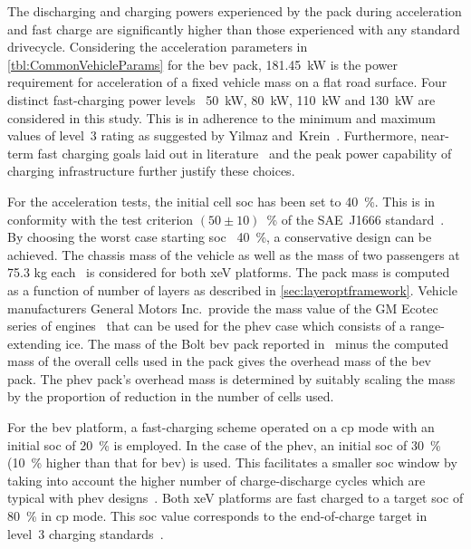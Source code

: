 The   discharging  and   charging  powers   experienced  by   the  pack   during
acceleration and  fast charge  are significantly  higher than  those experienced
with  any  standard  drivecycle.  Considering  the  acceleration  parameters  in
\cref{tbl:CommonVehicleParams} for  the \gls{bev}  pack, \SI{181.45}{\kilo\watt}
is   the  power   requirement  for   acceleration  of   a  fixed   vehicle  mass
on   a   flat  road   surface.   Four   distinct  fast-charging   power   levels
\viz~\SI{50}{\kilo\watt},   \SI{80}{\kilo\watt},  \SI{110}{\kilo\watt}   and
\SI{130}{\kilo\watt}  are considered  in this  study.  This is  in adherence  to
the  minimum  and maximum  values  of  level~3  rating  as suggested  by  Yilmaz
and~Krein~\cite{Yilmaz2012}. Furthermore, near-term fast charging goals laid out
in  literature~\cite{Ashique2017,Srdic2016} and  the  peak  power capability  of
charging infrastructure further justify these choices.



For  the  acceleration  tests,  the  initial cell  \gls{soc}  has  been  set  to
\SI{40}{\percent}.  This  is  in  conformity with  the  test  criterion  $(50\pm
10)$~\%  of  the  SAE~J1666   standard~\cite{Sae2010}.  By  choosing  the  worst
case  starting  \gls{soc} \ie~\SI{40}{\percent},  a  conservative design  can
be  achieved.  The  chassis  mass  of  the  vehicle  as  well  as  the  mass  of
two  passengers   at  75.3  kg   each~\cite{Sae2010}  is  considered   for  both
\gls{xeV}  platforms. The  pack mass  is  computed as  a function  of number  of
layers  as  described  in  \cref{sec:layeroptframework}.  Vehicle  manufacturers
General  Motors  Inc.\, provide  the  mass  value of  the  GM  Ecotec series  of
engines~\cite{motortrendEcotec} that can  be used for the  \gls{phev} case which
consists of  a range-extending \gls{ice}.  The mass  of the Bolt  \gls{bev} pack
reported in~\cite{ChevyBoltSpecs} minus  the computed mass of  the overall cells
used in the pack  gives the overhead mass of the  \gls{bev} pack. The \gls{phev}
pack's  overhead  mass  is  determined  by suitably  scaling  the  mass  by  the
proportion of reduction in the number of cells used.


For the \gls{bev}  platform, a fast-charging scheme operated on  a \gls{cp} mode
with an initial  \gls{soc} of \SI{20}{\percent} is employed. In  the case of the
\gls{phev}, an initial \gls{soc}  of \SI{30}{\percent} (\SI{10}{\percent} higher
than that for \gls{bev}) is used. This facilitates a smaller \gls{soc} window by
taking  into account  the higher  number  of charge-discharge  cycles which  are
typical with \gls{phev}  designs~\cite{Maksimovic2012}. Both \gls{xeV} platforms
are fast  charged to a target  \gls{soc} of \SI{80}{\percent} in  \gls{cp} mode.
This \gls{soc} value corresponds to the end-of-charge target in level~3 charging
standards~\cite{SAECharging2011}.

